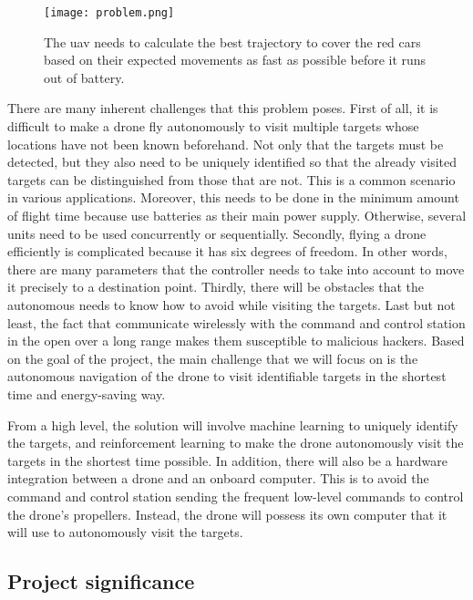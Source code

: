 \documentclass[../main.tex]{subfiles}
\begin{document}
\begin{figure}[tb] 
    \centering
    \texttt{[image: problem.png]} 
    \caption{The \gls{uav} needs to calculate 
    the best trajectory to cover the red cars
    based on their expected movements
    as fast as possible before it runs out of battery.} 
    \label{fig:problem} 
\end{figure}

There are many inherent challenges that this problem
poses. First of all, it is difficult to make a drone
fly autonomously to visit multiple targets whose locations
have not been known beforehand. 
Not only that the targets must be detected, 
but they also need to be uniquely
identified so that the already visited targets
can be distinguished from those that are not.
This is a common scenario in various applications. 
Moreover, this needs to be done in the minimum
amount of flight time because \uavs use batteries
as their main power supply.
Otherwise, several units need to be used concurrently
or sequentially.
Secondly, flying a drone efficiently is complicated 
because it has six degrees of freedom. In other words, 
there are many parameters that the controller needs to 
take into account to move 
it precisely to a destination point. 
Thirdly, there will be obstacles that the autonomous \uav
needs to know how to avoid while visiting the targets.
Last but not least, the fact that \uavs communicate wirelessly
with the command and control station in the open 
over a long range makes them susceptible
to malicious hackers.
Based on the goal of the project, the main challenge 
that we will focus on is the autonomous navigation
of the drone to visit identifiable targets in the shortest
time and energy-saving way.

From a high level, the solution will involve machine learning
to uniquely identify the targets, and reinforcement learning
to make the drone autonomously visit the targets in the
shortest time possible. In addition, there will also be
a hardware integration between a drone and an onboard
computer. This is to avoid the command and control
station sending the frequent low-level commands to control
the drone's propellers. 
Instead, the drone
will possess its own computer that it will use to 
autonomously visit the targets.

\subsection{Project significance}
\end{document}
